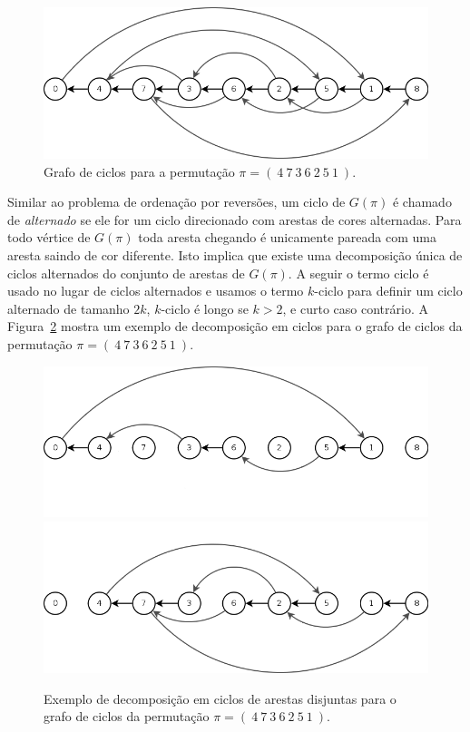 \begin{figure}[h]
  \centering 
  \includegraphics[scale=0.6]{images/trans_cycle_graph.png} 
  \caption{Grafo de ciclos para a permutação $\pi = (~4~7~3~6~2~5~1~)$.}
  \label{fig:trans_cycle_graph}
\end{figure}

Similar ao problema de ordenação por reversões, um ciclo de $G(\pi)$ é
chamado de \textit{alternado} se ele for um ciclo direcionado com
arestas de cores alternadas. Para todo vértice de $G(\pi)$ toda aresta
chegando é unicamente pareada com uma aresta saindo de cor
diferente. Isto implica que existe uma decomposição única de ciclos
alternados do conjunto de arestas de $G(\pi)$. A seguir o termo ciclo
é usado no lugar de ciclos alternados e usamos o termo $k$-ciclo para
definir um ciclo alternado de tamanho $2k$, $k$-ciclo é longo se $k >
2$, e curto caso contrário. A Figura~\ref{fig:tra_grafo_bkp_dec}
mostra um exemplo de decomposição em ciclos para o grafo de ciclos da
permutação $\pi = (~4~7~3~6~2~5~1~)$.


\begin{figure}[h]
  \centering 
  \includegraphics[scale=0.6]{images/trans_cycle_graph_dec-1.png}
  \includegraphics[scale=0.6]{images/trans_cycle_graph_dec-2.png} 
  \caption{Exemplo de decomposição em ciclos de arestas disjuntas para
  o grafo de ciclos da permutação $\pi = (~4~7~3~6~2~5~1~)$.}
  \label{fig:tra_grafo_bkp_dec}
\end{figure}

